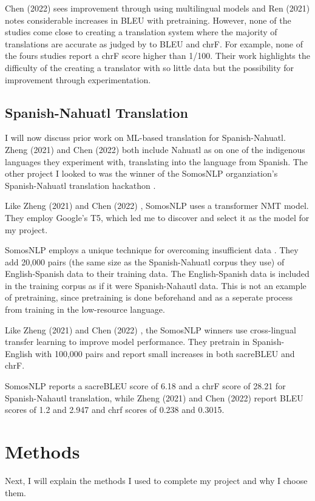 \documentclass[10pt,twocolumn]{article}
\begin{document}
Chen (2022) \cite {Chen} sees improvement through using multilingual models and Ren (2021) \cite{Ren} notes considerable increases in BLEU with pretraining. However, none of the studies come close to creating a translation system where the majority of translations are accurate as judged by to BLEU and chrF. For example, none of the fours studies report a chrF  score higher than 1/100. Their work highlights the difficulty of the creating a translator with so little data but the possibility for improvement through experimentation. 


\subsection{Spanish-Nahuatl Translation}

I will now discuss prior work on ML-based translation for Spanish-Nahuatl. Zheng (2021) \cite{Zheng} and Chen (2022) \cite {Chen}  both include Nahuatl as on one of the indigenous languages they experiment with, translating into the language from Spanish. The other project I looked to was the winner of the SomosNLP organziation's Spanish-Nahuatl translation hackathon \cite{SomosNLP}.

Like Zheng (2021) \cite{Zheng} and Chen (2022) \cite {Chen}, SomosNLP \cite{SomosNLP} uses a transformer NMT model. They employ Google's T5, which led me to discover and select it as the model for my project.

SomosNLP \cite{SomosNLP} employs a unique technique for overcoming insufficient data . They add 20,000 pairs (the same size as the Spanish-Nahuatl corpus they use) of English-Spanish data to their training data. The English-Spanish data is included in the training corpus as if it were Spanish-Nahautl data. This is not an example of pretraining, since pretraining is done beforehand and as a seperate process from training in the low-resource language.

Like Zheng (2021) \cite{Zheng} and Chen (2022) \cite{Chen}, the SomosNLP \cite{SomosNLP} winners use cross-lingual transfer learning to improve model performance. They pretrain in Spanish-English with 100,000 pairs and report small increases in both sacreBLEU and chrF. 

SomosNLP \cite {SomosNLP }reports a sacreBLEU score of 6.18 and a chrF score of 28.21 for Spanish-Nahautl translation, while Zheng (2021) \cite{Zheng} and Chen (2022) \cite{Chen} report BLEU scores of 1.2 and 2.947 and chrf scores of 0.238 and 0.3015. 

\section{Methods}
Next, I will explain the methods I used to complete my project and why I choose them. 
\end{document}
